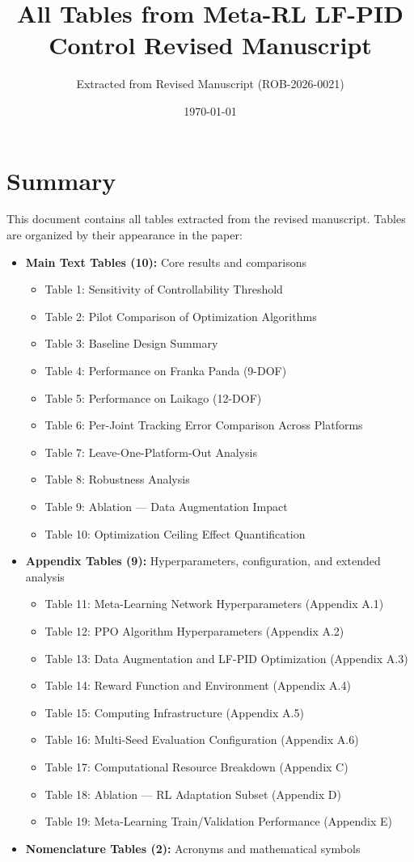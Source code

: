 \documentclass[11pt,a4paper]{article}
\title{All Tables from Meta-RL LF-PID Control Revised Manuscript}
\author{Extracted from Revised Manuscript (ROB-2026-0021)}
\date{\today}
\begin{document}
\maketitle

\section*{Summary}

This document contains all tables extracted from the revised manuscript. Tables are organized by their appearance in the paper:

\begin{itemize}
    \item \textbf{Main Text Tables (10):} Core results and comparisons
    \begin{itemize}
        \item Table 1: Sensitivity of Controllability Threshold
        \item Table 2: Pilot Comparison of Optimization Algorithms
        \item Table 3: Baseline Design Summary
        \item Table 4: Performance on Franka Panda (9-DOF)
        \item Table 5: Performance on Laikago (12-DOF)
        \item Table 6: Per-Joint Tracking Error Comparison Across Platforms
        \item Table 7: Leave-One-Platform-Out Analysis
        \item Table 8: Robustness Analysis
        \item Table 9: Ablation --- Data Augmentation Impact
        \item Table 10: Optimization Ceiling Effect Quantification
    \end{itemize}
    \item \textbf{Appendix Tables (9):} Hyperparameters, configuration, and extended analysis
    \begin{itemize}
        \item Table 11: Meta-Learning Network Hyperparameters (Appendix A.1)
        \item Table 12: PPO Algorithm Hyperparameters (Appendix A.2)
        \item Table 13: Data Augmentation and LF-PID Optimization (Appendix A.3)
        \item Table 14: Reward Function and Environment (Appendix A.4)
        \item Table 15: Computing Infrastructure (Appendix A.5)
        \item Table 16: Multi-Seed Evaluation Configuration (Appendix A.6)
        \item Table 17: Computational Resource Breakdown (Appendix C)
        \item Table 18: Ablation --- RL Adaptation Subset (Appendix D)
        \item Table 19: Meta-Learning Train/Validation Performance (Appendix E)
    \end{itemize}
    \item \textbf{Nomenclature Tables (2):} Acronyms and mathematical symbols
\end{itemize}
\end{document}
